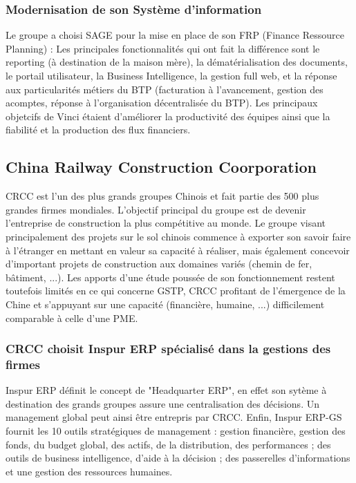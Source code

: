 \subsubsection{Modernisation de son Système d'information}
Le groupe a choisi SAGE pour la mise en place de son FRP (Finance Ressource Planning) :
Les principales fonctionnalités qui ont fait la différence sont le reporting (à destination de la maison mère), la dématérialisation des documents, le portail utilisateur, la Business Intelligence, la gestion full web, et la réponse aux particularités métiers du BTP (facturation à l'avancement, gestion des acomptes, réponse à l'organisation décentralisée du BTP).
Les principaux objetcifs de Vinci étaient d'améliorer la productivité des équipes ainsi que la fiabilité et la production des flux financiers.

\subsection{China Railway Construction Coorporation}
CRCC est l'un des plus grands groupes Chinois et fait partie des 500 plus grandes firmes mondiales. L'objectif principal du groupe est de devenir l'entreprise de construction la plus compétitive au monde.
Le groupe visant principalement des projets sur le sol chinois commence à exporter son savoir faire à l'étranger en mettant en valeur
sa capacité à réaliser, mais également concevoir d'important projets de construction aux domaines variés (chemin de fer, bâtiment, ...).
Les apports d'une étude poussée de son fonctionnement restent toutefois limités en ce qui concerne GSTP, 
CRCC profitant de l'émergence de la Chine et s'appuyant sur une capacité (financière, humaine, ...) difficilement comparable à celle d'une PME.


\subsubsection{CRCC choisit Inspur ERP spécialisé dans la gestions des firmes}
Inspur ERP définit le concept de "Headquarter ERP", en effet son sytème à destination des grands groupes assure une centralisation des décisions.
Un management global peut ainsi être entrepris par CRCC. 
Enfin, Inspur ERP-GS fournit les 10 outils stratégiques de management : gestion financière, gestion des fonds, du budget global, des actifs, de la distribution, des performances ; des outils de business intelligence, d'aide à la décision ; des passerelles d'informations et une gestion des ressources humaines.


